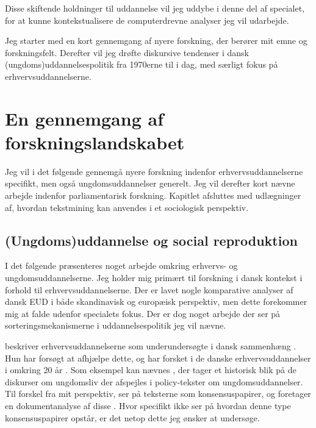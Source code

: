 Disse skiftende holdninger til uddannelse vil jeg uddybe i denne del af specialet, for at kunne kontekstualisere de computerdrevne analyser jeg vil udarbejde.

Jeg starter med en kort gennemgang af nyere forskning, der berører mit emne og forskningsfelt.
Derefter vil jeg drøfte diskursive tendenser i dansk (ungdoms)uddannelsespolitik fra 1970erne til i dag, med særligt fokus på erhvervsuddannelserne.

\chapter{En gennemgang af forskningslandskabet}\label{sec:litreview}

Jeg vil i det følgende gennemgå nyere forskning indenfor erhvervsuddannelserne specifikt, men også ungdomsuddannelser generelt.
Jeg vil derefter kort nævne arbejde indenfor parliamentarisk forskning.
Kapitlet afsluttes med udlægninger af, hvordan tekstmining kan anvendes i et sociologisk perspektiv.

\section{(Ungdoms)uddannelse og social reproduktion}
I det følgende præsenteres noget arbejde omkring erhvervs- og ungdomsuddannelserne.
Jeg holder mig primært til forskning i dansk kontekst i forhold til erhvervsuddannelserne.
Der er lavet nogle komparative analyser af dansk EUD i både skandinavisk og europæisk perspektiv, men dette forekommer mig at falde udenfor specialets fokus.
Der er dog noget arbejde der ser på sorteringsmekanismerne i uddannelsespolitik
jeg vil nævne.

\citeauthor{juulErhvervsuddannelserneForsomtForskningsomrade2004} beskriver erhvervsuddannelserne som underundersøgte i dansk sammenhæng \autocite{juulErhvervsuddannelserneForsomtForskningsomrade2004}.
Hun har forsøgt at afhjælpe dette, og har forsket i de danske erhvervsuddannelser i omkring 20 år \autocite{IdaJuulPublikationer}.
Som eksempel kan nævnes , der tager et historisk blik på de diskurser om ungdomsliv der afspejles i policy-tekster om ungdomsuddannelser.
Til forskel fra mit perspektiv, ser \citeauthor{juulDiskurserOmUngdom2013} på teksterne som konsensuspapirer, og foretager en dokumentanalyse af disse \autocite{juulDiskurserOmUngdom2013}.
Hvor \citeauthor{juulDiskurserOmUngdom2013} specifikt ikke ser på hvordan denne type konsensuspapirer opstår, er det netop dette jeg ønsker at undersøge.


